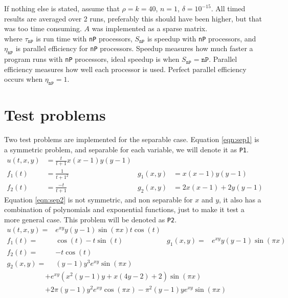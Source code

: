 If nothing else is stated, assume that $\rho = k = 40$, $n = 1$, $\delta = 10^{-15}$. All timed results are averaged over 2 runs, preferably this should have been higher, but that was too time consuming. $A$ was implemented as a sparse matrix.\\



where $\tau_\texttt{nP}$ is run time with \texttt{nP} processors, $S_\texttt{nP}$ is speedup with \texttt{nP} processors, and $\eta_\texttt{nP}$ is parallel efficiency for \texttt{nP} processors. Speedup measures how much faster a program runs with \texttt{nP} processors, ideal speedup is when $S_\texttt{nP} = \texttt{nP}$. Parallel efficiency measures how well each processor is used. Perfect parallel efficiency occurs when $\eta_\texttt{nP} = 1$.
\section{Test problems} \label{sec:test}
Two test problems are implemented for the separable case. Equation \eqref{eqn:sep1} is a symmetric problem, and separable for each variable, we will denote it as \texttt{P1}. 
\begin{equation} \label{eqn:sep1}
\begin{aligned}
 u(t,x,y)&= \frac{t}{t+1} x(x-1)y(y-1) \\
 f_1(t)&=\frac{1}{t+1^2} & g_1(x,y)&= x(x-1)y(y-1) \\
 f_2(t) &= \frac{-t}{t+1} & g_2(x,y)& = 2x(x-1) +2y(y-1)
 \end{aligned}
\end{equation}
Equation \eqref{eqn:sep2} is not symmetric, and non separable for $x$ and $y$, it also has a combination of polynomials and exponential functions, just to make it test a more general case. 
This problem will be denoted as \texttt{P2}.\\
\begin{equation} \label{eqn:sep2}
\begin{aligned}
 u(t,x,y)=& e^{xy}y(y-1) \sin( \pi x)t \cos(t)& \\
 f_1(t) =& \cos(t)-t \sin(t)  & g_1(x,y) =&e^{xy}y(y-1) \sin( \pi x)\\
 f_2(t) =& -t \cos(t) \\ g_2(x,y) =&(y-1)y^3e^{xy} \sin ( \pi x)
 \end{aligned}
\end{equation}
\begin{equation*}
\begin{aligned}
&+e^{xy}(x^2(y-1)y+x(4y-2)+2) \sin( \pi x) \\&+2 \pi (y-1) y^2 e^{xy} \cos( \pi x)- \pi^2 (y-1)y e^{xy} \sin( \pi x )
 \end{aligned}
\end{equation*}

